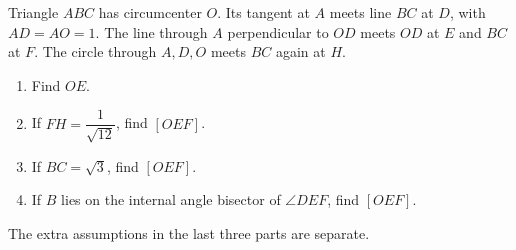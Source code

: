 Triangle $ABC$ has circumcenter $O$. Its tangent at $A$ meets line $BC$ at $D$, with $AD=AO=1$. The line through $A$ perpendicular to $OD$ meets $OD$ at $E$ and $BC$ at $F$. The circle through $A,D,O$ meets $BC$ again at $H$.
\begin{enumerate}
\item Find $OE$.
\item If $FH=\dfrac{1}{\sqrt{12}}$, find $[OEF]$.
\item If $BC=\sqrt3$, find $[OEF]$.
\item If $B$ lies on the internal angle bisector of $\angle DEF$, find $[OEF]$.
\end{enumerate}
The extra assumptions in the last three parts are separate.
